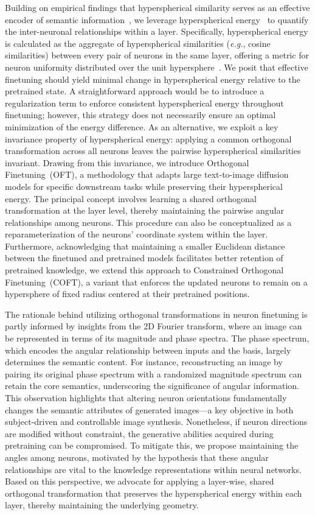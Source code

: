 Building on empirical findings that hyperspherical similarity serves as an effective encoder of semantic information~\cite{liu2017deep,liu2018decoupled,chen2020angular}, we leverage hyperspherical energy~\cite{liu2018learning} to quantify the inter-neuronal relationships within a layer. Specifically, hyperspherical energy is calculated as the aggregate of hyperspherical similarities (\emph{e.g.}, cosine similarities) between every pair of neurons in the same layer, offering a metric for neuron uniformity distributed over the unit hypersphere~\cite{liu2021learning}. We posit that effective finetuning should yield minimal change in hyperspherical energy relative to the pretrained state. A straightforward approach would be to introduce a regularization term to enforce consistent hyperspherical energy throughout finetuning; however, this strategy does not necessarily ensure an optimal minimization of the energy difference. As an alternative, we exploit a key invariance property of hyperspherical energy: applying a common orthogonal transformation across all neurons leaves the pairwise hyperspherical similarities invariant. Drawing from this invariance, we introduce Orthogonal Finetuning~(OFT), a methodology that adapts large text-to-image diffusion models for specific downstream tasks while preserving their hyperspherical energy. The principal concept involves learning a shared orthogonal transformation at the layer level, thereby maintaining the pairwise angular relationships among neurons. This procedure can also be conceptualized as a reparameterization of the neurons' coordinate system within the layer. Furthermore, acknowledging that maintaining a smaller Euclidean distance between the finetuned and pretrained models facilitates better retention of pretrained knowledge, we extend this approach to Constrained Orthogonal Finetuning~(COFT), a variant that enforces the updated neurons to remain on a hypersphere of fixed radius centered at their pretrained positions.

The rationale behind utilizing orthogonal transformations in neuron finetuning is partly informed by insights from the 2D Fourier transform, where an image can be represented in terms of its magnitude and phase spectra. The phase spectrum, which encodes the angular relationship between inputs and the basis, largely determines the semantic content. For instance, reconstructing an image by pairing its original phase spectrum with a randomized magnitude spectrum can retain the core semantics, underscoring the significance of angular information. This observation highlights that altering neuron orientations fundamentally changes the semantic attributes of generated images—a key objective in both subject-driven and controllable image synthesis. Nonetheless, if neuron directions are modified without constraint, the generative abilities acquired during pretraining can be compromised. To mitigate this, we propose maintaining the angles among neurons, motivated by the hypothesis that these angular relationships are vital to the knowledge representations within neural networks. Based on this perspective, we advocate for applying a layer-wise, shared orthogonal transformation that preserves the hyperspherical energy within each layer, thereby maintaining the underlying geometry.

